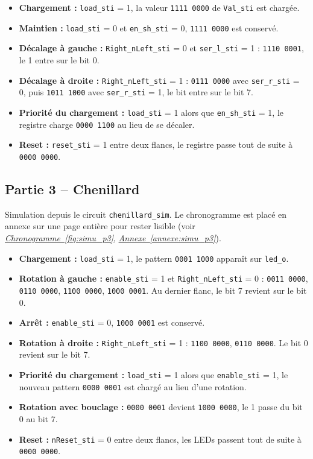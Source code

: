 \begin{itemize}
	\item \textbf{Chargement :} \texttt{load\_sti} = 1, la valeur \texttt{1111 0000} de \texttt{Val\_sti} est chargée.
	\item \textbf{Maintien :} \texttt{load\_sti} = 0 et \texttt{en\_sh\_sti} = 0, \texttt{1111 0000} est conservé.
	\item \textbf{Décalage à gauche :} \texttt{Right\_nLeft\_sti} = 0 et \texttt{ser\_l\_sti} = 1 : \texttt{1110 0001}, le 1 entre sur le bit 0.
	\item \textbf{Décalage à droite :} \texttt{Right\_nLeft\_sti} = 1 : \texttt{0111 0000} avec \texttt{ser\_r\_sti} = 0, puis \texttt{1011 1000} avec \texttt{ser\_r\_sti} = 1, le bit entre sur le bit 7.
	\item \textbf{Priorité du chargement :} \texttt{load\_sti} = 1 alors que \texttt{en\_sh\_sti} = 1, le registre charge \texttt{0000 1100} au lieu de se décaler.
	\item \textbf{Reset :} \texttt{reset\_sti} = 1 entre deux flancs, le registre passe tout de suite à \texttt{0000 0000}.
\end{itemize}

\newpage

\subsection{Partie 3 -- Chenillard}

Simulation depuis le circuit \texttt{chenillard\_sim}. Le chronogramme est placé en annexe sur une page entière pour rester lisible (voir \emph{\underline{Chronogramme~\ref{fig:simu_p3}}}, \emph{\underline{Annexe~\ref{annexe:simu_p3}}}).

\begin{itemize}
	\item \textbf{Chargement :} \texttt{load\_sti} = 1, le pattern \texttt{0001 1000} apparaît sur \texttt{led\_o}.
	\item \textbf{Rotation à gauche :} \texttt{enable\_sti} = 1 et \texttt{Right\_nLeft\_sti} = 0 : \texttt{0011 0000}, \texttt{0110 0000}, \texttt{1100 0000}, \texttt{1000 0001}. Au dernier flanc, le bit 7 revient sur le bit 0.
	\item \textbf{Arrêt :} \texttt{enable\_sti} = 0, \texttt{1000 0001} est conservé.
	\item \textbf{Rotation à droite :} \texttt{Right\_nLeft\_sti} = 1 : \texttt{1100 0000}, \texttt{0110 0000}. Le bit 0 revient sur le bit 7.
	\item \textbf{Priorité du chargement :} \texttt{load\_sti} = 1 alors que \texttt{enable\_sti} = 1, le nouveau pattern \texttt{0000 0001} est chargé au lieu d'une rotation.
	\item \textbf{Rotation avec bouclage :} \texttt{0000 0001} devient \texttt{1000 0000}, le 1 passe du bit 0 au bit 7.
	\item \textbf{Reset :} \texttt{nReset\_sti} = 0 entre deux flancs, les LEDs passent tout de suite à \texttt{0000 0000}.
\end{itemize}

